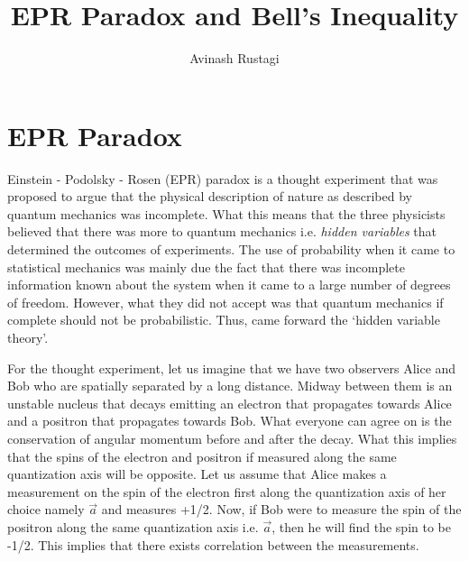 \documentclass[aps,prb,onecolumn,notitlepage,showpacs,floatfix,superscriptaddress]{revtex4-1}
\begin{document}
\title{EPR Paradox and Bell's Inequality}

\author{Avinash Rustagi}
%

\maketitle
%

\section{EPR Paradox}
Einstein - Podolsky - Rosen (EPR) paradox is a thought experiment that was proposed to argue that the physical description of nature as described by quantum mechanics was incomplete. What this means that the three physicists believed that there was more to quantum mechanics i.e. \textit{hidden variables} that determined the outcomes of experiments. The use of probability when it came to statistical mechanics was mainly due the fact that there was incomplete information known about the system when it came to a large number of degrees of freedom. However, what they did not accept was that quantum mechanics if complete should not be probabilistic. Thus, came forward the `hidden variable theory'.\\

\begin{center}
\end{center}

For the thought experiment, let us imagine that we have two observers Alice and Bob who are spatially separated by a long distance. Midway between them is an unstable nucleus that decays emitting an electron that propagates towards Alice and a positron that propagates towards Bob. What everyone can agree on is the conservation of angular momentum before and after the decay. What this implies that the spins of the electron and positron if measured along the same quantization axis will be opposite. Let us assume that Alice makes a measurement on the spin of the electron first along the quantization axis of her choice namely $\vec{a}$ and measures +1/2. Now, if Bob were to measure the spin of the positron along the same quantization axis i.e. $\vec{a}$, then he will find the spin to be -1/2. This implies that there exists correlation between the measurements.\\
\end{document}
